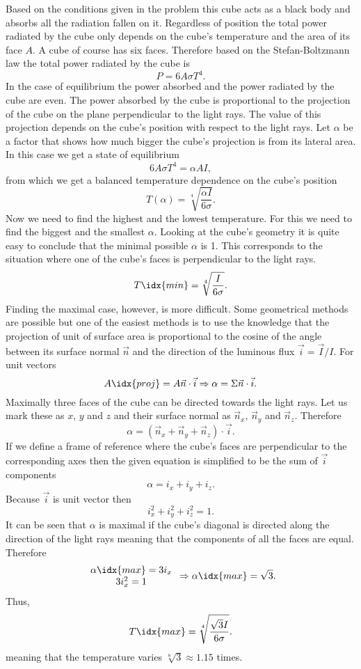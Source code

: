 {\ifEngSolution
Based on the conditions given in the problem this cube acts as a black body and absorbs all the radiation fallen on it. Regardless of position the total power radiated by the cube only depends on the cube’s temperature and the area of its face $A$. A cube of course has six faces. Therefore based on the Stefan-Boltzmann law the total power radiated by the cube is
$$
P=6A\sigma T^4 .
$$
In the case of equilibrium the power absorbed and the power radiated by the cube are even. The power absorbed by the cube is proportional to the projection of the cube on the plane perpendicular to the light rays. The value of this projection depends on the cube’s position with respect to the light rays. Let $\alpha$ be a factor that shows how much bigger the cube’s projection is from its lateral area. In this case we get a state of equilibrium 
$$
6A\sigma T^4=\alpha AI,
$$
from which we get a balanced temperature dependence on the cube’s position
$$
T(\alpha)=\sqrt[4]{\frac{\alpha I}{6\sigma}}.
$$
Now we need to find the highest and the lowest temperature. For this we need to find the biggest and the smallest $\alpha$. Looking at the cube’s geometry it is quite easy to conclude that the minimal possible $\alpha$ is 1. This corresponds to the situation where one of the cube’s faces is perpendicular to the light rays. 
$$
T\idx{min}=\sqrt[4]{\frac{ I}{6\sigma}}.
$$
Finding the maximal case, however, is more difficult. Some geometrical methods are possible but one of the easiest methods is to use the knowledge that the projection of unit of surface area is proportional to the cosine of the angle between its surface normal $\vec{n}$ and the direction of the luminous flux $\vec{i}=\vec{I}/I$. For unit vectors
$$
A\idx{proj}=A\vec{n}\cdot\vec{i} \Rightarrow \alpha=\Sigma\vec{n}\cdot\vec{i}.
$$
Maximally three faces of the cube can be directed towards the light rays. Let us mark these as $x$, $y$ and $z$ and their surface normal as $\vec{n}_x$, $\vec{n}_y$ and $\vec{n}_z$. Therefore
$$
\alpha= (\vec{n}_x + \vec{n}_y + \vec{n}_z) \cdot \vec{i}.
$$
If we define a frame of reference where the cube’s faces are perpendicular to the corresponding axes then the given equation is simplified to be the sum of $\vec{i}$ components
$$
\alpha = i_x + i_y + i_z.
$$
Because $\vec{i}$ is unit vector then
$$
i_x^2+i_y^2+i_z^2=1.
$$
It can be seen that $\alpha$ is maximal if the cube’s diagonal is directed along the direction of the light rays meaning that the components of all the faces are equal. Therefore
$$
\begin{array}{c} 
\alpha\idx{max} = 3i_x  \\ 3i_x^2=1  
\end{array}
\Rightarrow \alpha\idx{max}=\sqrt{3}.
$$
Thus,
$$
T\idx{max}=\sqrt[4]{\frac{\sqrt{3} I}{6\sigma}}.
$$
meaning that the temperature varies $\sqrt[8]{3} \approx 1.15$ times.
\fi
}